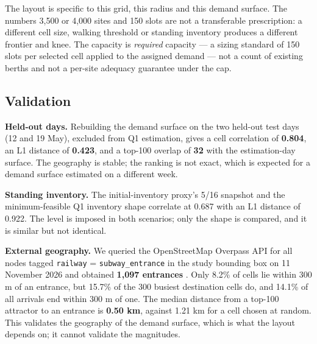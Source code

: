 The layout is specific to this grid, this radius and this demand surface. The numbers
3,500 or 4,000 sites and 150 slots are not a transferable prescription: a different cell
size, walking threshold or standing inventory produces a different frontier and knee. The
capacity is \emph{required} capacity --- a sizing standard of 150 slots per selected cell
applied to the assigned demand --- not a count of existing berths and not a per-site
adequacy guarantee under the cap.

\subsection{Validation}

\textbf{Held-out days.} Rebuilding the demand surface on the two held-out test days
(12 and 19 May), excluded from Q1 estimation, gives a cell correlation of \textbf{0.804},
an L1 distance of \textbf{0.423}, and a top-100 overlap of \textbf{32} with the
estimation-day surface. The geography is stable; the ranking is not exact, which is
expected for a demand surface estimated on a different week.

\textbf{Standing inventory.} The initial-inventory proxy's 5/16 snapshot and the minimum-feasible Q1
inventory shape correlate at 0.687 with an L1 distance of 0.922. The level is imposed in
both scenarios; only the shape is compared, and it is similar but not identical.

\textbf{External geography.} We queried the OpenStreetMap Overpass API for all nodes
tagged \texttt{railway} = \texttt{subway\_entrance} in the study bounding box on
11 November 2026 and obtained \textbf{1,097 entrances} \cite{osm}. Only 8.2\% of cells
lie within 300 m of an entrance, but 15.7\% of the 300 busiest destination cells do, and
14.1\% of all arrivals end within 300 m of one. The median distance from a top-100
attractor to an entrance is \textbf{0.50 km}, against 1.21 km for a cell chosen at
random. This validates the geography of the demand surface, which is what the layout
depends on; it cannot validate the magnitudes.
